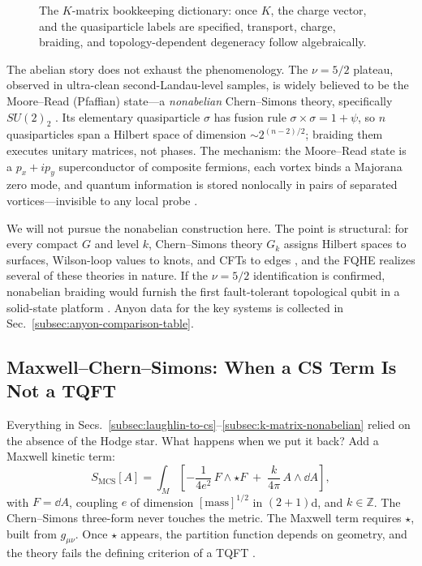 \begin{figure}[h]
    \centering
    
    \caption{The $K$-matrix bookkeeping dictionary: once $K$, the charge vector, and the quasiparticle labels are specified, transport, charge, braiding, and topology-dependent degeneracy follow algebraically.}
    \label{fig:fqhe-kmatrix-observables}
\end{figure}

The abelian story does not exhaust the phenomenology. The $\nu=5/2$ plateau, observed in ultra-clean second-Landau-level samples, is widely believed to be the Moore--Read (Pfaffian) state---a \emph{nonabelian} Chern--Simons theory, specifically $SU(2)_{2}$ \cite{NayakSimonSternFreedmanDasSarma2008NonabelianAnyons}. Its elementary quasiparticle $\sigma$ has fusion rule $\sigma\times\sigma = 1 + \psi$, so $n$ quasiparticles span a Hilbert space of dimension $\sim 2^{(n-2)/2}$; braiding them executes unitary matrices, not phases. The mechanism: the Moore--Read state is a $p_x + ip_y$ superconductor of composite fermions, each vortex binds a Majorana zero mode, and quantum information is stored nonlocally in pairs of separated vortices---invisible to any local probe \cite{Stern2008AnyonsQHEReview}.

We will not pursue the nonabelian construction here. The point is structural: for every compact $G$ and level $k$, Chern--Simons theory $G_k$ assigns Hilbert spaces to surfaces, Wilson-loop values to knots, and CFTs to edges \cite{Witten1989Jones,Dunne1999AspectsCS}, and the FQHE realizes several of these theories in nature. If the $\nu=5/2$ identification is confirmed, nonabelian braiding would furnish the first fault-tolerant topological qubit in a solid-state platform \cite{NayakSimonSternFreedmanDasSarma2008NonabelianAnyons}. Anyon data for the key systems is collected in Sec.~\ref{subsec:anyon-comparison-table}.

\subsection{Maxwell--Chern--Simons: When a CS Term Is Not a TQFT}
\label{subsec:maxwell-cs}

Everything in Secs.~\ref{subsec:laughlin-to-cs}--\ref{subsec:k-matrix-nonabelian} relied on the absence of the Hodge star. What happens when we put it back? Add a Maxwell kinetic term:
\begin{equation}
  S_{\mathrm{MCS}}[A]
  =
  \int_{M}\left[
  -\frac{1}{4e^{2}}\,F\wedge\star F
  \;+\;
  \frac{k}{4\pi}\,A\wedge\dd A
  \right],
  \label{eq:maxwell-cs-action}
\end{equation}
with $F = \dd A$, coupling $e$ of dimension $[\text{mass}]^{1/2}$ in $(2{+}1)$d, and $k\in\mathbb{Z}$. The Chern--Simons three-form never touches the metric. The Maxwell term requires $\star$, built from $g_{\mu\nu}$. Once $\star$ appears, the partition function depends on geometry, and the theory fails the defining criterion of a TQFT \cite{BirminghamBlauRakowskiThompson1991TopologicalFieldTheory}.

